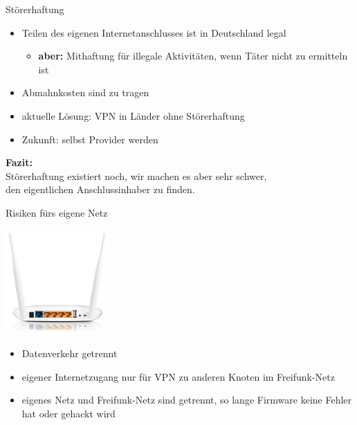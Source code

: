 \documentclass{beamer}
\begin{document}
\begin{frame}{Störerhaftung}
\begin{itemize}
\pause\item Teilen des eigenen Internetanschlusses ist in Deutschland legal
\begin{itemize}
	\pause\item \textbf{aber:} Mithaftung für illegale Aktivitäten, wenn Täter nicht zu ermitteln ist
\end{itemize}
\pause\item Abmahnkosten sind zu tragen
\vfill
\pause\item aktuelle Lösung: VPN in Länder ohne Störerhaftung
\pause\item Zukunft: selbst Provider werden
\end{itemize}
\vfill
\centering
\pause \textbf{Fazit:}\\Störerhaftung existiert noch, wir machen es aber sehr schwer,\\den eigentlichen Anschlussinhaber zu finden.

\end{frame}

\begin{frame}{Risiken fürs eigene Netz}
\vfill
\begin{center}
\includegraphics[height=4cm]{images/WR842ND-back}
\end{center}
\begin{itemize}
\pause\item Datenverkehr getrennt
\pause\item eigener Internetzugang nur für VPN zu anderen Knoten im Freifunk-Netz
\pause\item eigenes Netz und Freifunk-Netz sind getrennt, so lange Firmware keine Fehler hat oder gehackt wird
\end{itemize}
\vfill
\end{frame}
\end{document}
